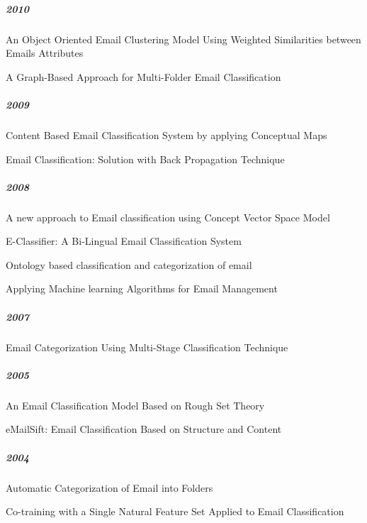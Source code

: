 \subparagraph{2010}
\begin{my_itemize}
  \item An Object Oriented Email Clustering Model Using Weighted Similarities between Emails Attributes \cite{NARESH10}
  \item A Graph-Based Approach for Multi-Folder Email Classification \cite{sift02}
\end{my_itemize}

\subparagraph{2009}
\begin{my_itemize}
  \item Content Based Email Classification System by applying Conceptual Maps \cite{BASKARAN09}
  \item Email Classification: Solution with Back Propagation Technique \cite{mous05}
\end{my_itemize}

\subparagraph{2008}
\begin{my_itemize}
  \item A new approach to Email classification using Concept Vector Space Model \cite{CHAO08}
  \item E-Classifier: A Bi-Lingual Email Classification System \cite{NOUF08}
  \item Ontology based classification and categorization of email \cite{BALAKUMAR08}
  \item Applying Machine learning Algorithms for Email Management \cite{mous03}
\end{my_itemize}

\subparagraph{2007}
\begin{my_itemize}
  \item Email Categorization Using Multi-Stage Classification Technique \cite{MD07}
\end{my_itemize}

\subparagraph{2005}
\begin{my_itemize}
  \item An Email Classification Model Based on Rough Set Theory \cite{WENQING05}
  \item eMailSift: Email Classification Based on Structure and Content \cite{sift01}
\end{my_itemize}

\subparagraph{2004}
\begin{my_itemize}
  \item Automatic Categorization of Email into Folders \cite{RON04}
  \item Co-training with a Single Natural Feature Set Applied to Email Classification \cite{mous04}
\end{my_itemize}

